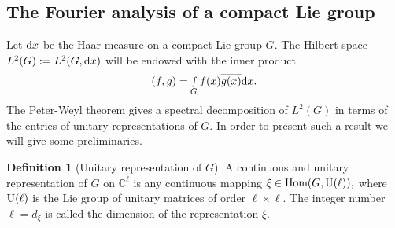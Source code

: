 \documentclass[12pt, reqno]{amsart}
\theoremstyle{definition}
\newtheorem{definition}[theorem]{Definition}
\theoremstyle{remark}
\numberwithin{equation}{section}
\begin{document}
\subsection{The Fourier analysis of a compact Lie group} Let $\textnormal{d}x$ be the Haar measure on a compact Lie group $G.$  
  The Hilbert space $L^{2}(G):=L^2(G,\textnormal{d}x)$ will be endowed with
   the inner product $$ (f,g)=\smallint\limits_{G}f(x)\overline{g(x)}\textnormal{d}x.$$   The Peter-Weyl theorem gives a spectral decomposition of $L^2(G)$  in terms of the entries of unitary representations of  $G$. In order to present such a result we will give some preliminaries.
\begin{definition}[Unitary representation of $G$]
    A continuous and unitary representation of  $G$ on $\mathbb{C}^{\ell}$ is any continuous mapping $\xi\in\textnormal{Hom}(G,\textnormal{U}(\ell)) ,$ where $\textnormal{U}(\ell)$ is the Lie group of unitary matrices of order $\ell\times \ell.$ The integer number $\ell=d_{\xi}$ is called the dimension of the representation $\xi.$ 
\end{definition}
\end{document}
